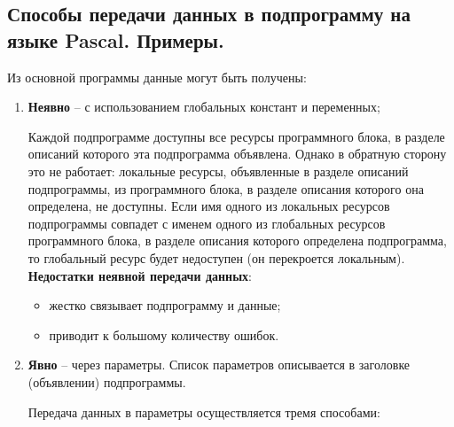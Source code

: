 



\newpage\subsection{Способы передачи данных в подпрограмму на языке Pascal. Примеры. }

\begin{myquote}
            
\end{myquote}

\noindent
Из основной программы данные могут быть получены:

\begin{enumerate}
    \item	{\bf{Неявно}} – с использованием глобальных констант и переменных;

            Каждой подпрограмме доступны все ресурсы программного блока, в разделе описаний которого эта подпрограмма объявлена. Однако в обратную сторону это не работает: локальные ресурсы, объявленные в разделе описаний подпрограммы, из программного блока, в разделе описания которого она определена, не доступны. Если имя одного из локальных ресурсов подпрограммы совпадет с именем одного из глобальных ресурсов программного блока, в разделе описания которого определена подпрограмма, то глобальный ресурс будет недоступен (он перекроется локальным).\\

            \noindent
            {\bf{Недостатки неявной передачи данных}}:

            \begin{itemize}
                \item жестко связывает подпрограмму и данные;
                \item приводит к большому количеству ошибок.
            \end{itemize}

    \item	{\bf{Явно}} – через параметры.
            Список параметров описывается в заголовке (объявлении) подпрограммы.
            

            \noindent
            Передача данных в параметры осуществляется тремя способами:
            \begin{itemize}


\end{itemize}
\end{enumerate}
